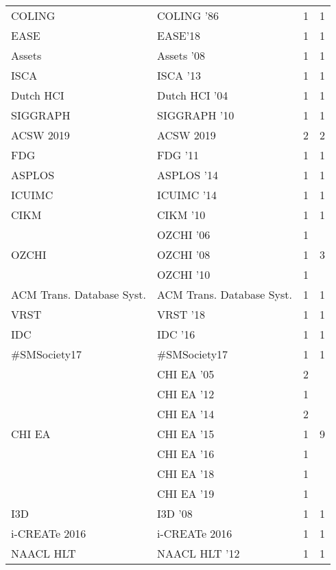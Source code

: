 \begin{table*}[t]
\begin{tabular}{llrr}
\multirow{1}{*}{COLING } & COLING '86 & 1 & \multirow{1}{*}{1}\\
\multirow{1}{*}{EASE} & EASE'18 & 1 & \multirow{1}{*}{1}\\
\multirow{1}{*}{Assets } & Assets '08 & 1 & \multirow{1}{*}{1}\\
\multirow{1}{*}{ISCA } & ISCA '13 & 1 & \multirow{1}{*}{1}\\
\multirow{1}{*}{Dutch HCI } & Dutch HCI '04 & 1 & \multirow{1}{*}{1}\\
\multirow{1}{*}{SIGGRAPH } & SIGGRAPH '10 & 1 & \multirow{1}{*}{1}\\
\multirow{1}{*}{ACSW 2019} & ACSW 2019 & 2 & \multirow{1}{*}{2}\\
\multirow{1}{*}{FDG } & FDG '11 & 1 & \multirow{1}{*}{1}\\
\multirow{1}{*}{ASPLOS } & ASPLOS '14 & 1 & \multirow{1}{*}{1}\\
\multirow{1}{*}{ICUIMC } & ICUIMC '14 & 1 & \multirow{1}{*}{1}\\
\multirow{1}{*}{CIKM } & CIKM '10 & 1 & \multirow{1}{*}{1}\\
\multirow{3}{*}{OZCHI } & OZCHI '06 & 1 & \multirow{3}{*}{3}\\
& OZCHI '08 & 1 &\\
& OZCHI '10 & 1 &\\
\multirow{1}{*}{ACM Trans. Database Syst.} & ACM Trans. Database Syst. & 1 & \multirow{1}{*}{1}\\
\multirow{1}{*}{VRST } & VRST '18 & 1 & \multirow{1}{*}{1}\\
\multirow{1}{*}{IDC } & IDC '16 & 1 & \multirow{1}{*}{1}\\
\multirow{1}{*}{\#SMSociety17} & \#SMSociety17 & 1 & \multirow{1}{*}{1}\\
\multirow{7}{*}{CHI EA } & CHI EA '05 & 2 & \multirow{7}{*}{9}\\
& CHI EA '12 & 1 &\\
& CHI EA '14 & 2 &\\
& CHI EA '15 & 1 &\\
& CHI EA '16 & 1 &\\
& CHI EA '18 & 1 &\\
& CHI EA '19 & 1 &\\
\multirow{1}{*}{I3D } & I3D '08 & 1 & \multirow{1}{*}{1}\\
\multirow{1}{*}{i-CREATe 2016} & i-CREATe 2016 & 1 & \multirow{1}{*}{1}\\
\multirow{1}{*}{NAACL HLT } & NAACL HLT '12 & 1 & \multirow{1}{*}{1}\\

\end{tabular}
\end{table*}
